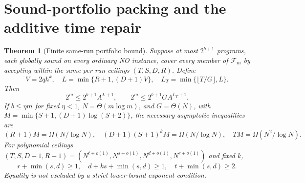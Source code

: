 \documentclass[11pt]{article}
\newtheorem{theorem}{Theorem}
\begin{document}
\section{Sound-portfolio packing and the additive time repair}
\begin{theorem}[Finite same-run portfolio bound]\label{th:portfolio}
Suppose at most $2^{b+1}$ programs, each globally sound on
\emph{every} ordinary NO instance, cover every member of
$\mathcal F_m$ by accepting within the \emph{same per-run}
ceilings $(T,S,D,R)$. Define
\[
 V=2qh^k,\quad
 L=\min\{R+1,(D+1)V\},\quad
 L_T=\min\{\lfloor T/G\rfloor,L\}.
\]
Then
\[
 \boxed{2^m\le2^{b+1}A^{L+1}},\qquad
 \boxed{2^m\le2^{b+1}G A^{L_T+1}}. \tag{5}
\]
If $b\le\eta m$ for fixed $\eta<1$, $N=\Theta(m\log m)$,
and $G=\Theta(N)$, with $M=\min\{S+1,(D+1)\log(S+2)\}$,
the necessary asymptotic inequalities are
\[
 \boxed{(R+1)M=\Omega(N/\log N)},\quad
 \boxed{(D+1)(S+1)^kM=\Omega(N/\log N)},\quad
 \boxed{TM=\Omega(N^2/\log N)}. \tag{6}
\]
For polynomial ceilings $(T,S,D+1,R+1)
=(N^{t+o(1)},N^{s+o(1)},N^{d+o(1)},N^{r+o(1)})$
and \emph{fixed} $k$,
\[
 \boxed{r+\min(s,d)\ge1,\quad
 d+ks+\min(s,d)\ge1,\quad
 t+\min(s,d)\ge2.} \tag{7}
\]
Equality is not excluded by a strict lower-bound exponent
condition.
\end{theorem}
\end{document}
